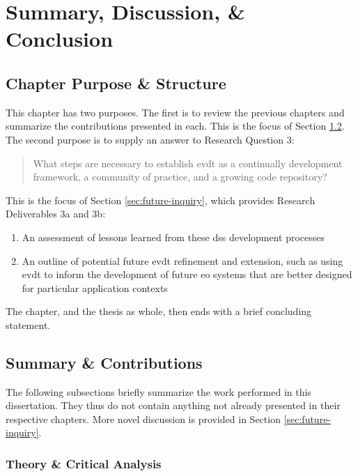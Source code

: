 \chapter{Summary, Discussion, \& Conclusion} \label{ch:conclusion}

\section{Chapter Purpose \& Structure}

This chapter has two purposes. The first is to review the previous chapters and summarize the contributions presented in each. This is the focus of Section \ref{sec:summary}. The second purpose is to supply an answer to Research Question 3:

\blockquote{What steps are necessary to establish \acf{evdt} as a continually development framework, a community of practice, and a growing code repository?}

This is the focus of Section \ref{sec:future-inquiry}, which provides Research Deliverables 3a and 3b:

	\begin{enumerate}[label=\emph{\alph*},itemsep=0pt,parsep=0pt]
		\item{An assessment of lessons learned from these \acf{dss} development processes} 
		\item{An outline of potential future \ac{evdt} refinement and extension, such as using \ac{evdt} to inform the development of future \acf{eo} systems that are better designed for particular application contexts}
	\end{enumerate}
	
The chapter, and the thesis as whole, then ends with a brief concluding statement.

\section{Summary \& Contributions} \label{sec:summary}

The following subsections briefly summarize the work performed in this dissertation. They thus do not contain anything not already presented in their respective chapters. More novel discussion is provided in Section \ref{sec:future-inquiry}.

\subsection{Theory \& Critical Analysis}

